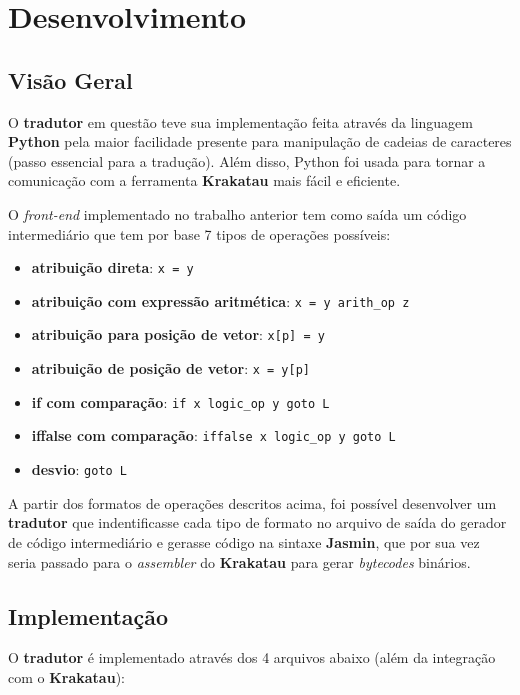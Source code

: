 \section{Desenvolvimento}

\subsection{Visão Geral}

O \textbf{tradutor} em questão teve sua implementação feita através da linguagem \textbf{Python} pela maior facilidade presente para manipulação de cadeias de caracteres (passo essencial para a tradução). Além disso, Python foi usada para tornar a comunicação com a ferramenta \textbf{Krakatau} mais fácil e eficiente.

O \textit{front-end} implementado no trabalho anterior tem como saída um código intermediário que tem por base 7 tipos de operações possíveis:

\begin{itemize}
\item \textbf{atribuição direta}: \texttt{x = y}
\item \textbf{atribuição com expressão aritmética}: \texttt{x = y arith\_op z}
\item \textbf{atribuição para posição de vetor}: \texttt{x[p] = y}
\item \textbf{atribuição de posição de vetor}: \texttt{x = y[p]}
\item \textbf{if com comparação}: \texttt{if x logic\_op y goto L}
\item \textbf{iffalse com comparação}: \texttt{iffalse x logic\_op y goto L}
\item \textbf{desvio}: \texttt{goto L}
\end{itemize}

A partir dos formatos de operações descritos acima, foi possível desenvolver um \textbf{tradutor} que indentificasse cada tipo de formato no arquivo de saída do gerador de código intermediário e gerasse código na sintaxe \textbf{Jasmin}, que por sua vez seria passado para o \textit{assembler} do \textbf{Krakatau} para gerar \textit{bytecodes} binários.


\subsection{Implementação}

O \textbf{tradutor} é implementado através dos 4 arquivos abaixo (além da integração com o \textbf{Krakatau}):

